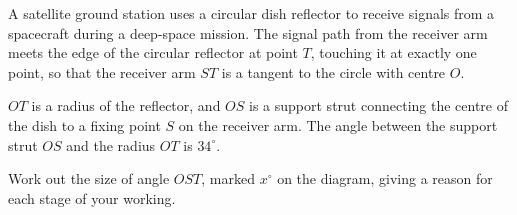 \begin{question}
\noindent A satellite ground station uses a circular dish reflector to receive signals from a spacecraft during a deep-space mission. The signal path from the receiver arm meets the edge of the circular reflector at point $T$, touching it at exactly one point, so that the receiver arm $ST$ is a tangent to the circle with centre $O$.

$OT$ is a radius of the reflector, and $OS$ is a support strut connecting the centre of the dish to a fixing point $S$ on the receiver arm. The angle between the support strut $OS$ and the radius $OT$ is $34^\circ$.

\begin{center}
\end{center}

\noindent Work out the size of angle $OST$, marked $x^\circ$ on the diagram, giving a reason for each stage of your working.

\vspace{5cm}

\begin{flushright}
\end{flushright}
\end{question}
